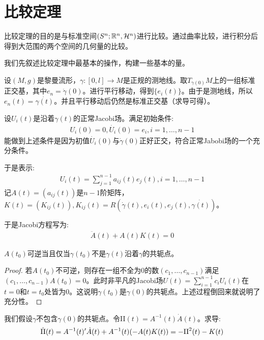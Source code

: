 \chapter{比较定理}
比较定理的目的是与标准空间$(S^n;\mathbb{R}^n,\mathcal{H}^n)$进行比较。通过曲率比较，进行积分后得到大范围的两个空间的几何量的比较。

我们先叙述比较定理中最基本的操作，构建一些基本的量。

设$(M,g)$是黎曼流形，$\gamma:[0,l] \to M$是正规的测地线。取$T_{\gamma(0)}M$上的一组标准正交基，其中$e_n=\dot{\gamma}(0)$。进行平行移动，得到$\{e_i(t)\}$。由于是测地线，所以$e_n(t)=\dot{\gamma(t)}$。并且平行移动后仍然是标准正交基（求导可得）。

设$U_i(t)$是沿着$\gamma(t)$的正常Jacobi场。满足初始条件:
\begin{align*}
    U_i(0)=0,\dot{U_i}(0)=e_i,i=1,\dots,n-1
\end{align*}
能做到上述条件是因为初值$\dot{U_i}(0)$与$\dot{\gamma}(0)$正好正交，符合正常Jabobi场的一个充分条件。

于是表示:
\begin{align*}
    U_i(t)=\sum_{j=1}^{n-1}a_{ij}(t)e_j(t),i=1,\dots,n-1
\end{align*}
记$A(t)=(a_{ij}(t))$是$n-1$阶矩阵，$K(t)=(K_{ij}(t)),K_{ij}(t)=R(\dot{\gamma}(t),e_i(t),e_j(t),\dot{\gamma(t)})$。

于是Jacobi方程写为:
\begin{align*}
    \ddot{A}(t)+A(t)K(t)=0
\end{align*}
\begin{proposition}
    $A(t_0)$可逆当且仅当$\gamma(t_0)$不是$\gamma(t)$沿着$\gamma$的共轭点。
\end{proposition}
\begin{proof}
    若$A(t_0)$不可逆，则存在一组不全为$0$的数$(c_1,\dots,c_{n-1})$满足$(c_1,\dots,c_{n-1})A(t_0)=0$。此时非平凡的Jacobi场$U(t)=\sum_{i=1}^{n-1}c_iU_i(t)$在$t=0$和$t=t_0$处皆为$0$。这说明$\gamma(t_0)$是$\gamma(0)$的共轭点。上述过程倒回来就说明了充分性。
\end{proof}

我们假设$\gamma$不包含$\gamma(0)$的共轭点。令II$(t)=A^{-1}(t)\dot{A}(t)$。求导:
\begin{align*}
    \dot{\mathrm{II}}(t)=A^{-1}(t)'\dot{A}(t)+A^{-1}(t)(-A(t)K(t))=-\mathrm{II}^2(t)-K(t)
\end{align*}

